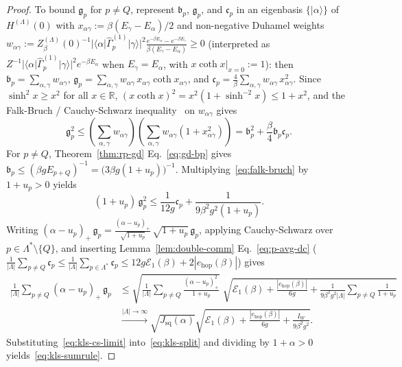 \documentclass[11pt]{article}
\theoremstyle{definition}
\theoremstyle{remark}
\newcommand{\calE}{\mathcal{E}}
\newcommand{\bbR}{\mathbb{R}}
\begin{document}
\begin{proof}
To bound $\mathfrak{g}_p$ for $p \ne Q$, represent $\mathfrak{b}_p$, $\mathfrak{g}_p$, and $\mathfrak{c}_p$ in an eigenbasis $\{|\alpha\rangle\}$ of $H^{(\Lambda)}(0)$ with $x_{\alpha\gamma} := \beta(E_\gamma - E_\alpha)/2$ and non-negative Duhamel weights $w_{\alpha\gamma} := Z_\beta^{(\Lambda)}(0)^{-1}|\langle \alpha|\hat{\Gamma}_p^{(1)}|\gamma\rangle|^2 \frac{e^{-\beta E_\alpha} - e^{-\beta E_\gamma}}{\beta(E_\gamma - E_\alpha)} \ge 0$ (interpreted as $Z^{-1}|\langle \alpha|\hat{\Gamma}_p^{(1)}|\gamma\rangle|^2 e^{-\beta E_\alpha}$ when $E_\gamma = E_\alpha$, with $x\coth x|_{x=0} := 1$): then $\mathfrak{b}_p = \sum_{\alpha,\gamma} w_{\alpha\gamma}$, $\mathfrak{g}_p = \sum_{\alpha,\gamma} w_{\alpha\gamma}\,x_{\alpha\gamma}\coth x_{\alpha\gamma}$, and $\mathfrak{c}_p = \frac{4}{\beta}\sum_{\alpha,\gamma} w_{\alpha\gamma}\,x_{\alpha\gamma}^2$. Since $\sinh^2 x \ge x^2$ for all $x \in \bbR$, $(x\coth x)^2 = x^2(1 + \sinh^{-2} x) \le 1 + x^2$, and the Falk-Bruch / Cauchy-Schwarz inequality~\cite{falk1969,dyson1978} on $w_{\alpha\gamma}$ gives
\begin{equation}\label{eq:falk-bruch}
\mathfrak{g}_p^2 \le \left(\sum_{\alpha,\gamma} w_{\alpha\gamma}\right)\left(\sum_{\alpha,\gamma} w_{\alpha\gamma}(1 + x_{\alpha\gamma}^2)\right) = \mathfrak{b}_p^2 + \frac{\beta}{4}\mathfrak{b}_p \mathfrak{c}_p.
\end{equation}
For $p \ne Q$, Theorem~\ref{thm:rp-gd} Eq.~\eqref{eq:gd-bp} gives $\mathfrak{b}_p \le (\beta g E_{p+Q})^{-1} = \bigl(3\beta g(1 + u_p)\bigr)^{-1}$. Multiplying~\eqref{eq:falk-bruch} by $1 + u_p > 0$ yields
\begin{equation*}
(1 + u_p)\,\mathfrak{g}_p^2 \le \frac{1}{12 g}\mathfrak{c}_p + \frac{1}{9\beta^2 g^2(1 + u_p)}.
\end{equation*}
Writing $(\alpha - u_p)_+\,\mathfrak{g}_p = \frac{(\alpha - u_p)_+}{\sqrt{1 + u_p}}\,\sqrt{1 + u_p}\,\mathfrak{g}_p$, applying Cauchy-Schwarz over $p \in \Lambda^* \setminus \{Q\}$, and inserting Lemma~\ref{lem:double-comm} Eq.~\eqref{eq:p-avg-dc} ($\frac{1}{|\Lambda|}\sum_{p \ne Q}\mathfrak{c}_p \le \frac{1}{|\Lambda|}\sum_{p \in \Lambda^*}\mathfrak{c}_p \le 12g\calE_1(\beta) + 2|e_{\mathrm{hop}}(\beta)|$) gives
\begin{align}
\frac{1}{|\Lambda|} \sum_{p \ne Q} (\alpha - u_p)_+\,\mathfrak{g}_p &\le \sqrt{\frac{1}{|\Lambda|}\sum_{p \ne Q} \frac{(\alpha - u_p)_+^2}{1 + u_p}} \;\sqrt{\calE_1(\beta) + \frac{|e_{\mathrm{hop}}(\beta)|}{6g} + \frac{1}{9\beta^2 g^2 |\Lambda|} \sum_{p \ne Q} \frac{1}{1 + u_p}} \nonumber\\
&\xrightarrow{|\Lambda|\to\infty} \sqrt{J_{\mathrm{sq}}(\alpha)}\sqrt{\calE_1(\beta) + \frac{|e_{\mathrm{hop}}(\beta)|}{6g} + \frac{I_W}{9\beta^2 g^2}}. \label{eq:kls-cs-limit}
\end{align}
Substituting~\eqref{eq:kls-cs-limit} into~\eqref{eq:kls-split} and dividing by $1 + \alpha > 0$ yields~\eqref{eq:kls-sumrule}.
\end{proof}
\end{document}
